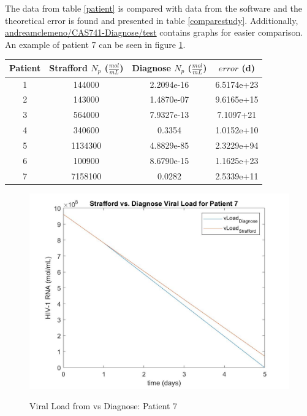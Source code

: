 \documentclass[12pt, titlepage]{article}
\begin{document}
The data from table \ref{patient} is compared with data from the \progname{} software and the theoretical error is found and presented in table \ref{comparestudy}. Additionally, \href{https://github.com/andreamclemeno/CAS741-Diagnose/tree/master/test}{andreamclemeno/CAS741-Diagnose/test} contains graphs for easier comparison. An example of patient 7 can be seen in figure \ref{Fig_graphexample}.  

\begin{center}
 \begin{tabular}{||c||c|c|c||} 
 \hline
  \bf{Patient}  & \textbf{Strafford $N_{p}$ ($\frac{mol}{mL}$)} & \textbf{Diagnose $N_{p}$ ($\frac{mol}{mL}$)} & \textbf{$error$ (d)} \\ [0.5ex] 
  \hline
   1 & 144000	 & 2.2094e-16	 & 6.5174e+23 \\
  \hline
   2 & 	143000 & 1.4870e-07	 &  9.6165e+15\\
  \hline
   3 & 	564000 & 7.9327e-13	 &  7.1097+21\\
  \hline
   4 & 	340600 & 0.3354	 &  1.0152e+10\\
  \hline
   5 & 1134300	 & 4.8829e-85	 &  2.3229e+94\\
  \hline
   6 & 100900	 & 8.6790e-15 &  1.1625e+23\\
  \hline
   7 & 7158100 & 0.0282	 &  2.5339e+11\\
  \hline
\end{tabular}
\label{comparestudy}
\end{center}	

\begin{figure}[h!]
 \begin{center}
 {
  \includegraphics[width=1\textwidth]{graphexample.jpg}
 }
 \caption{Viral Load from \citet{Stafford2000} vs  Diagnose: Patient 7}

 \label{Fig_graphexample}
 \end{center}
 \end{figure}
\end{document}
